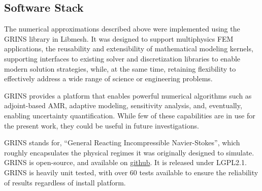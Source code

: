 

\subsection{Software Stack}

The numerical approximations described above were implemented using the
GRINS library\cite{GRINSpaper} in Libmesh\cite{libMeshPaper}. 
It was designed to support multiphysics FEM
applications, the reusability and extensibility of mathematical
modeling kernels, supporting interfaces to existing solver and
discretization libraries to enable modern solution strategies, while, at
the same time, retaining flexibility to effectively address a wide range
of science or engineering problems. 

GRINS provides a platform that enables powerful numerical algorithms
such as adjoint-based AMR, adaptive modeling, sensitivity analysis,
and, eventually, enabling uncertainty quantification. While few of these
capabilities are in use for the present work, they could be useful in
future investigations. 

GRINS stands for, ``General Reacting Incompressible Navier-Stokes'',
which roughly encapsulates the physical regimes it was originally
designed to simulate. GRINS is open-source, and available on
\hyperref[www.github.com/grinsfem/grins]{github}. It is released 
under LGPL2.1.  GRINS is heavily unit tested, with over 60 tests
available to ensure the reliability of results regardless of install platform.



